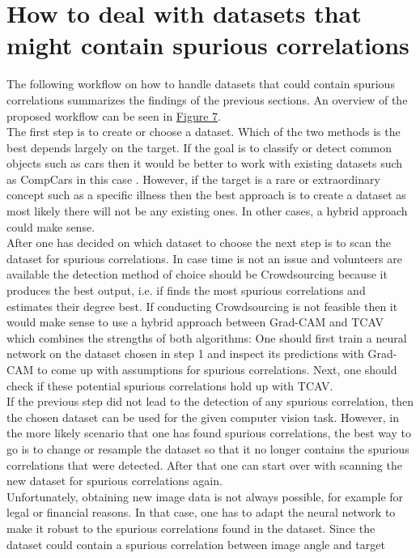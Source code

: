 \documentclass{article}
\begin{document}
\section{How to deal with datasets that might contain spurious correlations}
The following workflow on how to handle datasets that could contain spurious correlations summarizes the findings of the previous sections.
An overview of the proposed workflow can be seen in \hyperref[fig:workflow]{Figure 7}. \\
The first step is to create or choose a dataset. Which of the two methods is the best depends largely on the target. If the goal is to classify or
detect common objects such as cars then it would be better to work with existing datasets such as CompCars in this case \cite{Yang_2015_CVPR}.
However, if the target is a rare or extraordinary concept such as a specific illness then the best approach is to create a dataset as most likely there will
not be any existing ones. In other cases, a hybrid approach could make sense. \\
After one has decided on which dataset to choose the next step is to scan the dataset for spurious correlations. In case time is not an issue
and volunteers are available the detection method of choice should be Crowdsourcing because it produces the best output, i.e. if finds the most spurious
correlations and estimates their degree best. If conducting Crowdsourcing is not feasible then it would make sense to use a hybrid approach between Grad-CAM and TCAV which
combines the strengths of both algorithms: One should first train a neural network on the dataset chosen in step 1 and inspect its predictions with Grad-CAM
to come up with assumptions for spurious correlations. Next, one should check if these potential spurious correlations hold up with TCAV. \\
If the previous step did not lead to the detection of any spurious correlation, then the chosen dataset can be used for the given computer vision task. 
However, in the more likely scenario that one has found spurious correlations, the best way to go is to change or resample the dataset so that it no longer
contains the spurious correlations that were detected. After that one can start over with scanning the new dataset for spurious correlations again. \\
Unfortunately, obtaining new image data is not always possible, for example for legal or financial reasons. In that case, one has to adapt the neural network
to make it robust to the spurious correlations found in the dataset. Since the dataset could contain a spurious correlation between image angle and target
\end{document}
